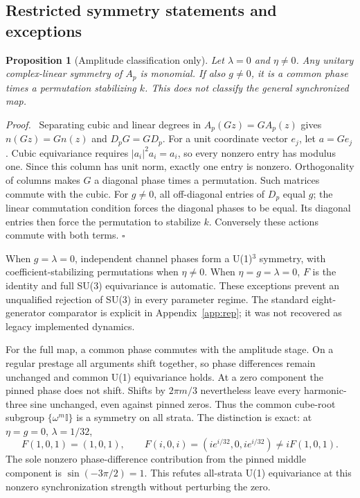 \documentclass[11pt,a4paper]{article}
\numberwithin{equation}{section}
\newtheorem{proposition}{Proposition}[section]
\newenvironment{proof}{\par\noindent\textit{Proof.}\ }{\hfill$\square$\par}
\newcommand{\I}{\mathbb I}\newcommand{\Argz}{\operatorname{Arg}_0}
\begin{document}
\subsection{Restricted symmetry statements and exceptions}\label{sec:classification}
\begin{proposition}[Amplitude classification only]\label{prop:monomial}
Let $\lambda=0$ and $\eta\ne0$. Any unitary complex-linear symmetry of $A_p$ is monomial. If also $g\ne0$, it is a common phase times a permutation stabilizing $k$. This does not classify the general synchronized map.
\end{proposition}
\begin{proof}
Separating cubic and linear degrees in $A_p(Gz)=GA_p(z)$ gives $n(Gz)=Gn(z)$ and $D_pG=GD_p$. For a unit coordinate vector $e_j$, let $a=Ge_j$. Cubic equivariance requires $|a_i|^2a_i=a_i$, so every nonzero entry has modulus one. Since this column has unit norm, exactly one entry is nonzero. Orthogonality of columns makes $G$ a diagonal phase times a permutation. Such matrices commute with the cubic. For $g\ne0$, all off-diagonal entries of $D_p$ equal $g$; the linear commutation condition forces the diagonal phases to be equal. Its diagonal entries then force the permutation to stabilize $k$. Conversely these actions commute with both terms.
\end{proof}
When $g=\lambda=0$, independent channel phases form a U(1)$^3$ symmetry, with coefficient-stabilizing permutations when $\eta\ne0$. When $\eta=g=\lambda=0$, $F$ is the identity and full SU(3) equivariance is automatic. These exceptions prevent an unqualified rejection of SU(3) in every parameter regime. The standard eight-generator comparator is explicit in Appendix~\ref{app:rep}; it was not recovered as legacy implemented dynamics.

For the full map, a common phase commutes with the amplitude stage. On a regular prestage all arguments shift together, so phase differences remain unchanged and common U(1) equivariance holds. At a zero component the pinned phase does not shift. Shifts by $2\pi m/3$ nevertheless leave every harmonic-three sine unchanged, even against pinned zeros. Thus the common cube-root subgroup $\{\omega^m\I\}$ is a symmetry on all strata. The distinction is exact: at $\eta=g=0$, $\lambda=1/32$,
\begin{equation}\label{eq:zeroboundary}
 F(1,0,1)=(1,0,1),\qquad F(i,0,i)=(ie^{i/32},0,ie^{i/32})\ne iF(1,0,1).
\end{equation}
The sole nonzero phase-difference contribution from the pinned middle component is $\sin(-3\pi/2)=1$. This refutes all-strata U(1) equivariance at this nonzero synchronization strength without perturbing the zero.
\end{document}
